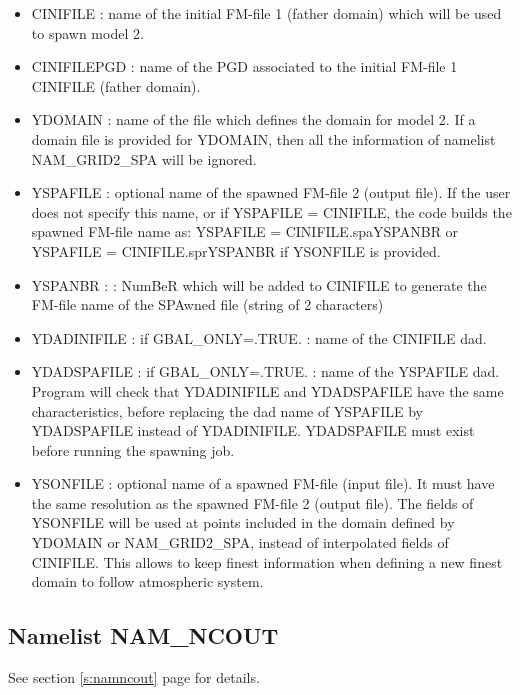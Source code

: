 \begin{itemize}
\item CINIFILE :
name of the initial FM-file 1 (father domain)
which will be used to spawn model 2.
\item CINIFILEPGD :
name of the PGD associated to the initial FM-file 1 CINIFILE (father domain).
\item YDOMAIN : 
name of the file which defines the domain for model 2. If a domain file is provided for YDOMAIN, then all the information of namelist NAM\_GRID2\_SPA will be ignored. 
\item YSPAFILE : optional name of the spawned FM-file 2 (output file).
If the user does not specify this name,
or if YSPAFILE = CINIFILE, the code builds the spawned FM-file name as:
\subitem YSPAFILE = CINIFILE.spaYSPANBR
\subitem or YSPAFILE = CINIFILE.sprYSPANBR if YSONFILE is provided.
\item YSPANBR :
 :
NumBeR which will be added to CINIFILE to generate the  
FM-file name of the SPAwned file (string of 2 characters)
\item YDADINIFILE : if GBAL\_ONLY=.TRUE. : name of the CINIFILE dad.
\item YDADSPAFILE : if GBAL\_ONLY=.TRUE. : name of the YSPAFILE dad. 
Program will check that YDADINIFILE and YDADSPAFILE have the same 
characteristics,
before replacing the dad name of YSPAFILE by YDADSPAFILE instead of YDADINIFILE.
YDADSPAFILE must exist before running the spawning job. 
\item YSONFILE : optional name of a spawned FM-file (input file). 
It must have the same resolution as the spawned FM-file 2 (output file).
The fields of YSONFILE will be used at points included in the domain
defined by YDOMAIN or NAM\_GRID2\_SPA, instead of interpolated fields
 of CINIFILE.
This allows to keep finest information when defining a new finest domain to
follow atmospheric system.
\end{itemize} 
\subsection{Namelist NAM\_NCOUT}
See section \ref{s:namncout} page \pageref{s:namncout} for details.

